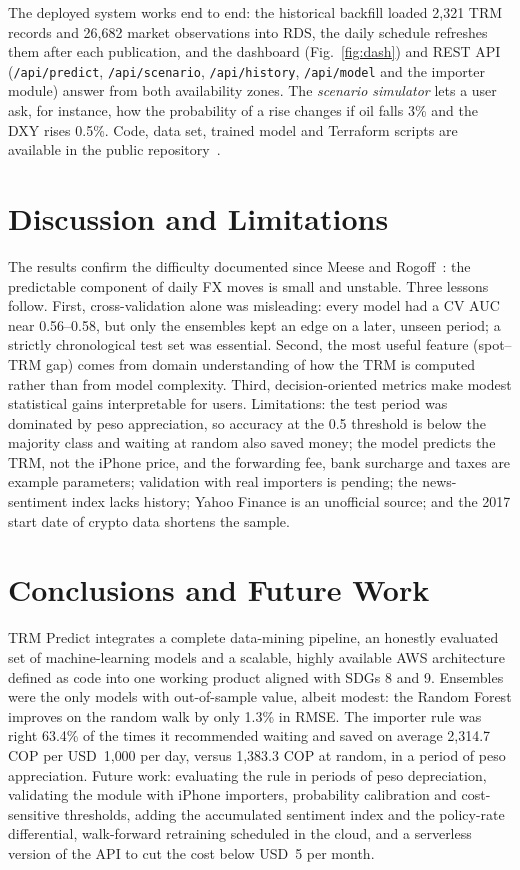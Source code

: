\documentclass[conference]{IEEEtran}
\begin{document}
The deployed system works end to end: the historical backfill loaded 2{,}321 TRM records and 26{,}682 market observations into RDS, the daily schedule refreshes them after each publication, and the dashboard (Fig.~\ref{fig:dash}) and REST API (\texttt{/api/predict}, \texttt{/api/scenario}, \texttt{/api/history}, \texttt{/api/model} and the importer module) answer from both availability zones. The \emph{scenario simulator} lets a user ask, for instance, how the probability of a rise changes if oil falls 3\% and the DXY rises 0.5\%. Code, data set, trained model and Terraform scripts are available in the public repository~\cite{repo}.

\section{Discussion and Limitations}
\label{sec:disc}
The results confirm the difficulty documented since Meese and Rogoff~\cite{meese1983}: the predictable component of daily FX moves is small and unstable. Three lessons follow. First, cross-validation alone was misleading: every model had a CV AUC near 0.56--0.58, but only the ensembles kept an edge on a later, unseen period; a strictly chronological test set was essential. Second, the most useful feature (spot--TRM gap) comes from domain understanding of how the TRM is computed rather than from model complexity. Third, decision-oriented metrics make modest statistical gains interpretable for users. Limitations: the test period was dominated by peso appreciation, so accuracy at the 0.5 threshold is below the majority class and waiting at random also saved money; the model predicts the TRM, not the iPhone price, and the forwarding fee, bank surcharge and taxes are example parameters; validation with real importers is pending; the news-sentiment index lacks history; Yahoo Finance is an unofficial source; and the 2017 start date of crypto data shortens the sample.

\section{Conclusions and Future Work}
TRM Predict integrates a complete data-mining pipeline, an honestly evaluated set of machine-learning models and a scalable, highly available AWS architecture defined as code into one working product aligned with SDGs 8 and 9. Ensembles were the only models with out-of-sample value, albeit modest: the Random Forest improves on the random walk by only 1.3\% in RMSE. The importer rule was right 63.4\% of the times it recommended waiting and saved on average 2{,}314.7 COP per USD~1{,}000 per day, versus 1{,}383.3 COP at random, in a period of peso appreciation. Future work: evaluating the rule in periods of peso depreciation, validating the module with iPhone importers, probability calibration and cost-sensitive thresholds, adding the accumulated sentiment index and the policy-rate differential, walk-forward retraining scheduled in the cloud, and a serverless version of the API to cut the cost below USD~5 per month.
\end{document}
